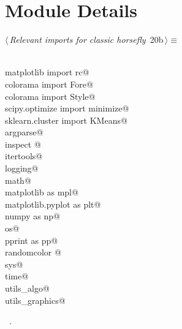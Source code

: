 \documentclass[11.5pt]{report}
\begin{document}
\section{Module Details}

\newchunk 

\begin{flushleft} \small\label{scrap22}\raggedright\small
{} $\langle\,${\itshape Relevant imports for classic horsefly}\nobreak\ {\footnotesize {20b}}$\,\rangle\equiv$
\vspace{-1ex}
\begin{list}{}{} \item
\mbox{}\verb@@\\
\mbox{}\verb@from matplotlib import rc@\\
\mbox{}\verb@from colorama import Fore@\\
\mbox{}\verb@from colorama import Style@\\
\mbox{}\verb@from scipy.optimize import minimize@\\
\mbox{}\verb@from sklearn.cluster import KMeans@\\
\mbox{}\verb@import argparse@\\
\mbox{}\verb@import inspect @\\
\mbox{}\verb@import itertools@\\
\mbox{}\verb@import logging@\\
\mbox{}\verb@import math@\\
\mbox{}\verb@import matplotlib as mpl@\\
\mbox{}\verb@import matplotlib.pyplot as plt@\\
\mbox{}\verb@import numpy as np@\\
\mbox{}\verb@import os@\\
\mbox{}\verb@import pprint as pp@\\
\mbox{}\verb@import randomcolor @\\
\mbox{}\verb@import sys@\\
\mbox{}\verb@import time@\\
\mbox{}\verb@import utils_algo@\\
\mbox{}\verb@import utils_graphics@\\
\mbox{}\verb@@{\NWsep}
\end{list}
\vspace{-1.5ex}
\footnotesize
\begin{list}{}{\setlength{\itemsep}{-\parsep}\setlength{\itemindent}{-\leftmargin}}
\item \NWtxtMacroRefIn\ .

\item{}
\end{list}
\vspace{4ex}
\end{flushleft}
\end{document}
